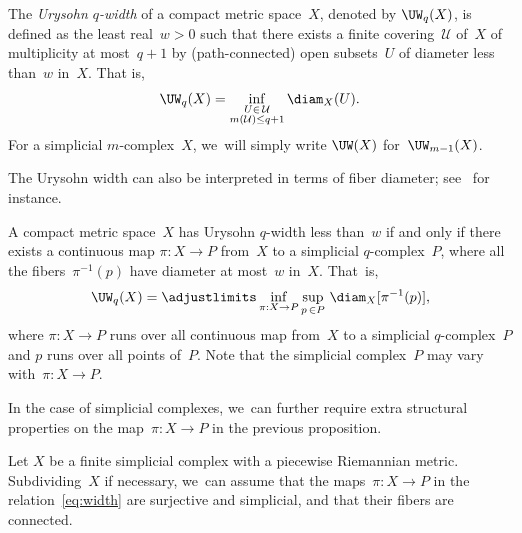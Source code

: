 \begin{definition} \label{def:UW}
The \emph{Urysohn $q$-width} of a compact metric space~$X$, denoted by $\UW_q(X)$, is defined as the least real~$w >0$ such that there exists a finite covering~$\mathcal{U}$ of~$X$ of multiplicity at most~$q+1$ by (path-connected) open subsets~$U$ of diameter less than~$w$ in~$X$.
That is,
\[
\UW_q(X) = \inf_{\substack{U \in \, \mathcal{U} \\ m(\mathcal{U}) \leq q+1}} \diam_X(U).
\]
For a simplicial $m$\nobreakdash-complex~$X$, we~will simply write $\UW(X)$ for~$\UW_{m-1}(X)$.
\end{definition}

The Urysohn width can also be interpreted in terms of fiber diameter; see~\cite[Lem.\,0.8]{Guth17} for instance.

\begin{proposition} \label{prop:UW}
A compact metric space~$X$ has Urysohn $q$-width less than~$w$ if and only if there exists a continuous map $\pi:X \to P$ from~$X$ to a simplicial $q$-complex~$P$, where all the fibers~$\pi^{-1}(p)$ have diameter at most~$w$ in~$X$.
That~is,
\begin{equation} \label{eq:width}
\UW_q(X) = \adjustlimits \inf_{\pi:X \to P} \sup_{p \, \in P} \, \diam_X [\pi^{-1}(p)],
\end{equation}
where $\pi:X \to P$ runs over all continuous map from~$X$ to a simplicial $q$-complex~$P$ and $p$ runs over all points of~$P$.
Note that the simplicial complex~$P$ may vary with~$\pi:X \to P$.
\end{proposition}

In the case of simplicial complexes, we~can further require extra structural properties on the map~$\pi:X \to P$ in the previous proposition.

\begin{proposition} \label{prop:width}
Let $X$ be a finite simplicial complex with a piecewise Riemannian metric.
Subdividing~$X$ if necessary, we~can assume that the maps~$\pi:X \to P$ in the relation~\eqref{eq:width} are surjective and simplicial, and that their fibers are connected.
\end{proposition}

